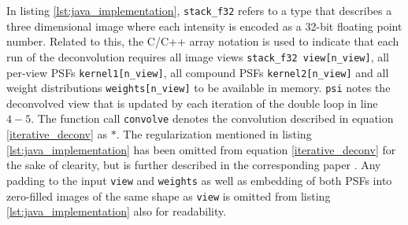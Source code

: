 In listing \ref{lst:java_implementation}, \texttt{stack\_f32} refers to a type that describes a three dimensional image where each intensity is encoded as a 32-bit floating point number. Related to this, the C/C++ array notation is used to indicate that each run of the deconvolution requires all image views \texttt{stack\_f32 view[n\_view]}, all per-view PSFs \texttt{kernel1[n\_view]}, all compound PSFs \texttt{kernel2[n\_view]} and all weight distributions \texttt{weights[n\_view]} to be available in memory. \texttt{psi} notes the deconvolved view that is updated by each iteration of the double loop in line $4-5$. The function call \texttt{convolve} denotes the convolution described in equation \ref{iterative_deconv} as $\ast$. The regularization mentioned in listing \ref{lst:java_implementation} has been omitted from equation \ref{iterative_deconv} for the sake of clearity, but is further described in the corresponding paper \cite{2013arXiv1308.0730P}. Any padding to the input \texttt{view} and \texttt{weights} as well as embedding of both PSFs into zero-filled images of the same shape as \texttt{view} is omitted from listing \ref{lst:java_implementation} also for readability. \newline

